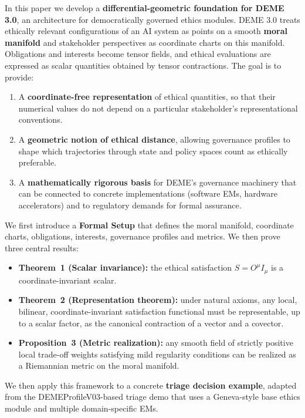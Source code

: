 \documentclass[12pt]{article}
\theoremstyle{remark}
\begin{document}
In this paper we develop a \textbf{differential-geometric foundation for DEME 3.0}, an architecture for democratically governed ethics modules. DEME 3.0 treats ethically relevant configurations of an AI system as points on a smooth \textbf{moral manifold} and stakeholder perspectives as coordinate charts on this manifold. Obligations and interests become tensor fields, and ethical evaluations are expressed as scalar quantities obtained by tensor contractions. The goal is to provide:

\begin{enumerate}
    \item A \textbf{coordinate-free representation} of ethical quantities, so that their numerical values do not depend on a particular stakeholder's representational conventions.
    \item A \textbf{geometric notion of ethical distance}, allowing governance profiles to shape which trajectories through state and policy spaces count as ethically preferable.
    \item A \textbf{mathematically rigorous basis} for DEME's governance machinery that can be connected to concrete implementations (software EMs, hardware accelerators) and to regulatory demands for formal assurance.
\end{enumerate}

We first introduce a \textbf{Formal Setup} that defines the moral manifold, coordinate charts, obligations, interests, governance profiles and metrics. We then prove three central results:

\begin{itemize}
    \item \textbf{Theorem~1 (Scalar invariance):} the ethical satisfaction $S = O^\mu I_\mu$ is a coordinate-invariant scalar.
    \item \textbf{Theorem~2 (Representation theorem):} under natural axioms, any local, bilinear, coordinate-invariant satisfaction functional must be representable, up to a scalar factor, as the canonical contraction of a vector and a covector.
    \item \textbf{Proposition~3 (Metric realization):} any smooth field of strictly positive local trade-off weights satisfying mild regularity conditions can be realized as a Riemannian metric on the moral manifold.
\end{itemize}

We then apply this framework to a concrete \textbf{triage decision example}, adapted from the DEMEProfileV03-based triage demo that uses a Geneva-style base ethics module and multiple domain-specific EMs.
\end{document}
